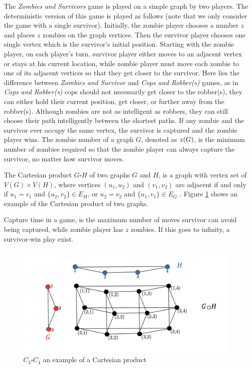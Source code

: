 \documentclass[1p]{elsarticle}
\newcommand{\zn}{\ooalign{$z$\cr\hfil\rule[.5ex]{.2em}{.08ex}\hfil\cr}}
\begin{document}
The {\it Zombies and Survivors} game is played on a simple graph by two players. The deterministic version of this game
\cite{Fitz16} is played as follows (note that we only consider the game with a single survivor). Initially, the zombie
player chooses a number $z$ and places $z$ zombies on the graph vertices. Then the survivor player chooses one single
vertex which is the survivor's initial position. Starting with the zombie player, on each player's turn, survivor player
either moves to an adjacent vertex or stays at his current location, while zombie player must move each zombie to one of
its adjacent vertices so that they get closer to the survivor. Here lies the difference between {\it Zombies and
Survivor} and {\it Cops and Robber(s)} games, as in {\it Cops and Robber(s)} cops should not necessarily get closer to
the robber(s), they can either hold their current position, get closer, or further away from the robber(s). Although
zombies are not as intelligent as robbers, they can still choose their path intelligently between the shortest paths.
If any zombie and the survivor ever occupy the same vertex, the survivor is captured and the zombie player wins. The
zombie number of a graph $G$, denoted as $\zn(G)$, is the minimum number of zombies required so that the zombie player can
always capture the survivor, no matter how survivor moves.

The Cartesian product $G \square H$ of two graphs $G$ and $H$, is a graph with vertex set of $V(G) \times V(H)$, where
vertices $(u_1 , u_2)$ and $(v_1 , v_2)$ are adjacent if and only if $u_1 = v_1$ and $ \{ u_2 , v_2 \} \in E_{H} $, or
$u_2 = v_2$ and $ \{u_1 , v_1 \} \in E_{G}$ \cite{West02}. Figure \ref{fig:p2} shows an example of the Cartesian product
of two graphs.

Capture time in a game, is the maximum number of moves survivor can avoid being captured, while zombie player has $z$
zombies. If this goes to infinity, a survivor-win play exist.

\begin{figure}[h!]
	\centering
	\includegraphics[width=0.9\linewidth]{fig/CpWest.png}
	\caption{$C_3 \square C_4$ an example of a Cartesian product}
	\label{fig:p2}
\end{figure}
\end{document}

